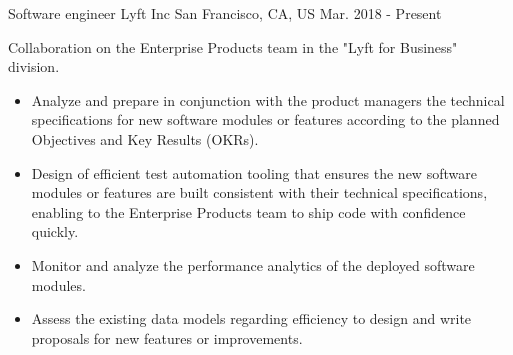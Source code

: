 


\begin{cventries}
	
	
	\cventry
	{Software engineer} %
	{Lyft Inc} %
	{San Francisco, CA, US} %
	{Mar. 2018 - Present} %
	{ %
		\begin{cvitems}
			\item {Collaboration on the Enterprise Products team in the "Lyft for Business" division.}
			\begin{itemize}
				\item {Analyze and prepare in conjunction with the product managers the technical specifications for new software modules or features according to the planned Objectives and Key Results (OKRs).}
				\item{Design of efficient test automation tooling that ensures the new software modules or features are built consistent with their technical specifications, enabling to the Enterprise Products team to ship code with confidence quickly.}
				\item {Monitor and analyze the performance analytics of the deployed software modules.}
				\item {Assess the existing data models regarding efficiency to design and write proposals for new features or improvements.}
			\end{itemize}
		\end{cvitems}
	}
		
	

\end{cventries}
